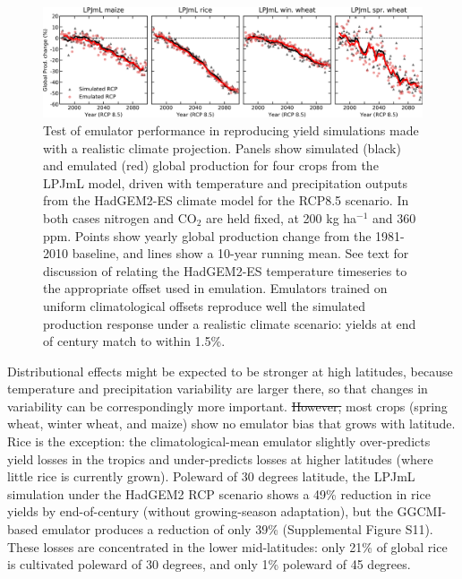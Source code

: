 \documentclass[gmdd]{copernicus} %
\providecommand{\DIFadd}[1]{{\protect\color{blue}\uwave{#1}}} %
\providecommand{\DIFdel}[1]{{\protect\color{red}\sout{#1}}}                      %
\providecommand{\DIFaddbegin}{} %
\providecommand{\DIFaddend}{} %
\providecommand{\DIFdelbegin}{} %
\providecommand{\DIFdelend}{} %
\begin{document}
\DIFaddbegin 


\DIFaddend \begin{figure}[ht]
    \centering
    \includegraphics[width = 16.3cm]{figures/LPJMLRCP85comp.png}
    \caption{
    Test of emulator performance in reproducing yield simulations made with a realistic climate projection. 
    Panels show simulated (black) and emulated (red) global production for four crops from the LPJmL model, driven with temperature and precipitation outputs from the HadGEM2-ES climate model for the RCP8.5 scenario. 
    In both cases nitrogen and CO$_2$ are held fixed, at 200 kg ha$^{-1}$ and 360 ppm.
    Points show yearly global production change from the 1981-2010 baseline, and lines show a 10-year running mean. 
    See text for discussion of relating the HadGEM2-ES temperature timeseries to the appropriate offset used in emulation.
    Emulators trained on uniform climatological offsets reproduce well the simulated production response under a realistic climate scenario: yields at end of century match to within 1.5\%. 
    }
    \label{fig:lpjmlrcp}
\end{figure}

Distributional effects might be expected to be stronger at high latitudes, because temperature and precipitation variability are larger there, so that changes in variability can be correspondingly more important. 
\DIFdelbegin \DIFdel{However, }\DIFdelend \DIFaddbegin \DIFadd{We find however that }\DIFaddend most crops (spring wheat, winter wheat, and maize) show no emulator bias that grows with latitude.
Rice is the exception: the climatological-mean emulator slightly over-predicts yield losses in the tropics and under-predicts losses at higher latitudes (where little rice is currently grown). 
Poleward of 30 degrees latitude, the LPJmL simulation under the HadGEM2 RCP scenario shows a 49\% reduction in rice yields by end-of-century (without growing-season adaptation), but the GGCMI-based emulator produces a reduction of only 39\% (Supplemental Figure S11). 
These losses are concentrated in the lower mid-latitudes: only 21\% of global rice is cultivated poleward of 30 degrees, and only 1\% poleward of 45 degrees.
\end{document}
